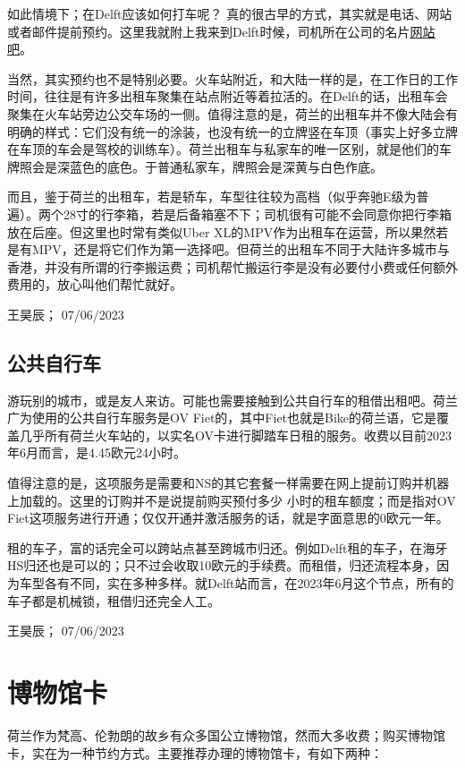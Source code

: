 如此情境下；在Delft应该如何打车呢？ 真的很古早的方式，其实就是电话、网站或者邮件提前预约。这里我就附上我来到Delft时候，司机所在公司的名片\href{https://taxidelfland.nl/}{\uline{网站吧}}。

当然，其实预约也不是特别必要。火车站附近，和大陆一样的是，在工作日的工作时间，往往是有许多出租车聚集在站点附近等着拉活的。在Delft的话，出租车会聚集在火车站旁边公交车场的一侧。值得注意的是，荷兰的出租车并不像大陆会有明确的样式：它们没有统一的涂装，也没有统一的立牌竖在车顶（事实上好多立牌在车顶的车会是驾校的训练车）。荷兰出租车与私家车的唯一区别，就是他们的车牌照会是深蓝色的底色。于普通私家车，牌照会是深黄与白色作底。

而且，鉴于荷兰的出租车，若是轿车，车型往往较为高档（似乎奔驰E级为普遍）。两个28寸的行李箱，若是后备箱塞不下；司机很有可能不会同意你把行李箱放在后座。但这里也时常有类似Uber XL的MPV作为出租车在运营，所以果然若是有MPV，还是将它们作为第一选择吧。但荷兰的出租车不同于大陆许多城市与香港，并没有所谓的行李搬运费；司机帮忙搬运行李是没有必要付小费或任何额外费用的，放心叫他们帮忙就好。
\begin{flushright}
王昊辰； 07/06/2023
\end{flushright}

\subsection{公共自行车}
游玩别的城市，或是友人来访。可能也需要接触到公共自行车的租借出租吧。荷兰广为使用的公共自行车服务是OV Fiet的，其中Fiet也就是Bike的荷兰语，它是覆盖几乎所有荷兰火车站的，以实名OV卡进行脚踏车日租的服务。收费以目前2023年6月而言，是4.45欧元24小时。

值得注意的是，这项服务是需要和NS的其它套餐一样需要在网上提前订购并机器上加载的。这里的订购并不是说提前购买预付多少
小时的租车额度；而是指对OV Fiet这项服务进行开通；仅仅开通并激活服务的话，就是字面意思的0欧元一年。

租的车子，富的话完全可以跨站点甚至跨城市归还。例如Delft租的车子，在海牙HS归还也是可以的；只不过会收取10欧元的手续费。而租借，归还流程本身，因为车型各有不同，实在多种多样。就Delft站而言，在2023年6月这个节点，所有的车子都是机械锁，租借归还完全人工。
\begin{flushright}
王昊辰； 07/06/2023
\end{flushright}

\section{博物馆卡}
荷兰作为梵高、伦勃朗的故乡有众多国公立博物馆，然而大多收费；购买博物馆卡，实在为一种节约方式。主要推荐办理的博物馆卡，有如下两种：

